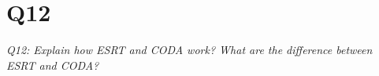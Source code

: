 \chapter{Q12}
\emph{Q12: Explain how ESRT and CODA work? What are the difference between ESRT
and CODA?}
